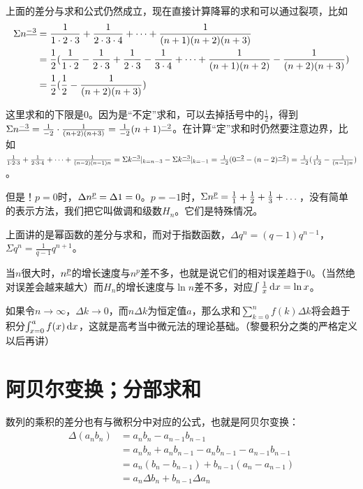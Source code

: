 上面的差分与求和公式仍然成立，现在直接计算降幂的求和可以通过裂项，比如
\begin{align*}
\Sigma n^{\underline{-3}}&=\frac{1}{1 \cdot 2 \cdot 3}+\frac{1}{2 \cdot 3 \cdot 4}+\dots+\frac{1}{(n+1)(n+2)(n+3)} \\
&=\frac{1}{2}(\frac{1}{1 \cdot 2}-\frac{1}{2 \cdot 3}+\frac{1}{2 \cdot 3}-\frac{1}{3 \cdot 4}+\cdots+\frac{1}{(n+1)(n+2)}-\frac{1}{(n+2)(n+3)}) \\
&=\frac{1}{2}(\frac{1}{2}-\frac{1}{(n+2)(n+3)})
\end{align*}

这里求和的下限是$0$。因为是“不定”求和，可以去掉括号中的$\frac{1}{2}$，得到$\Sigma n^{\underline{-3}}=\frac{1}{-2} \cdot \frac{1}{(n+2)(n+3)}=\frac{1}{-2}(n+1)^{\underline{-2}}$。在计算“定”求和时仍然要注意边界，比如$\frac{1}{1 \cdot 2 \cdot 3}+\frac{1}{2 \cdot 3 \cdot 4}+\dots+\frac{1}{(n-2)(n-1)n}=\Sigma k^{\underline{-3}}|_{k=n-3}-\Sigma k^{\underline{-3}}|_{k=-1}=\frac{1}{-2}(0^{\underline{-2}}-(n-2)^{\underline{-2}})=\frac{1}{-2}(\frac{1}{1 \cdot 2}-\frac{1}{(n-1)n})$。

但是！$p=0$时，$\Delta n^{\underline{p}}=\Delta 1=0$。$p=-1$时，$\Sigma n^{\underline{p}}=\frac{1}{1}+\frac{1}{2}+\frac{1}{3}+\dots$，没有简单的表示方法，我们把它叫做调和级数$H_n$。它们是特殊情况。

上面讲的是幂函数的差分与求和，而对于指数函数，$\Delta q^n=(q-1) q^{n-1}$，$\Sigma q^n=\frac{1}{q-1} q^{n+1}$。

当$n$很大时，$n^{\underline{p}}$的增长速度与$n^p$差不多，也就是说它们的相对误差趋于$0$。（当然绝对误差会越来越大）而$H_n$的增长速度与$\ln n$差不多，对应$\int \frac{1}{x} \mathop{}\!\mathrm{d} x=\ln x$。

如果令$n \rightarrow \infty$，$\Delta k \rightarrow 0$，而$n \Delta k$为恒定值$a$，那么求和$\sum_{k=0}^n f(k) \Delta k$将会趋于积分$\int_{x=0}^a f(x) \mathop{}\!\mathrm{d} x$，这就是高考当中微元法的理论基础。（黎曼积分之类的严格定义以后再讲）
\section{阿贝尔变换；分部求和}
数列的乘积的差分也有与微积分中对应的公式，也就是阿贝尔变换：
\begin{align*}
\Delta(a_n b_n)&=a_n b_n-a_{n-1} b_{n-1} \\
&=a_n b_n+a_n b_{n-1}-a_n b_{n-1}-a_{n-1} b_{n-1} \\
&=a_n(b_n-b_{n-1})+b_{n-1}(a_n-a_{n-1}) \\
&=a_n \Delta b_n+b_{n-1} \Delta a_n
\end{align*}


